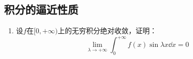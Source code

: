     \subsection{积分的逼近性质}
    \begin{enumerate}
        \item 设\(f\)在\([0,+\infty)\)上的无穷积分绝对收敛，证明：\[\lim_{\lambda\to+\infty}\int_{0}^{+\infty}f(x)\sin\lambda x\dd x=0\]
    \end{enumerate}